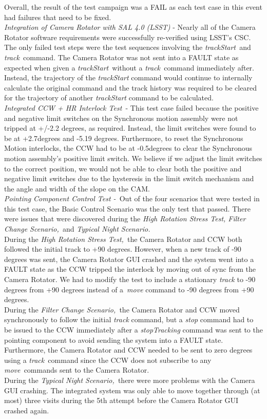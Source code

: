 \documentclass[SE,lsstdraft,STR,toc]{lsstdoc}
\begin{document}
 Overall, the result of the test campaign was a FAIL as each test case in
this event had failures that need to be
fixed.\\[2\baselineskip]\emph{Integration of Camera Rotator with SAL 4.0
(LSST)} - Nearly all of the Camera Rotator software requirements were
successfully re-verified using LSST's CSC. The only failed test steps
were the test sequences involving the \emph{trackStart~}and
\emph{track~}command. The Camera Rotator was not sent into a FAULT state
as expected when given a \emph{trackStart~}without a
\emph{track~}command immediately after. Instead, the trajectory of the
\emph{trackStart} command would continue to internally calculate the
original command and the track history was required to be cleared for
the trajectory of another \emph{trackStart} command to be
calculated.\\[2\baselineskip]\emph{Integrated CCW + HR Interlock Test~}-
This test case failed because the positive and negative limit switches
on the Synchronous motion assembly were not tripped at +/-2.2 degrees,
as required. Instead, the limit switches were found to be at +2.7degrees
and -5.19 degrees. Furthermore, to reset the Synchronous Motion
interlocks, the CCW had to be at -0.5degrees to clear the Synchronous
motion assembly's positive limit switch. We believe if we adjust the
limit switches to the correct position, we would not be able to clear
both the positive and negative limit switches due to the hysteresis in
the limit switch mechanism and the angle and width of the slope on the
CAM.\\[2\baselineskip]\emph{Pointing Component Control Test -~}Out of
the four scenarios that were tested in this test case, the Basic Control
Scenario was the only test that passed. There were issues that were
discovered during the \emph{High Rotation Stress Test, Filter Change
Scenario,~}and \emph{Typical Night Scenario.}\\
During the \emph{High Rotation Stress Test,~}the Camera Rotator and CCW
both followed the initial track to +90 degrees. However, when a new
track of -90 degrees was sent, the Camera Rotator GUI crashed and the
system went into a FAULT state as the CCW tripped the interlock by
moving out of sync from the Camera Rotator. We had to modify the test to
include a stationary \emph{track} to -90 degrees from +90 degrees
instead of a~\emph{move} command to -90 degrees from +90 degrees.\\
During the \emph{Filter Change Scenario,~}the Camera Rotator and CCW
moved synchronously to follow the initial \emph{track} command, but a
\emph{stop} command had to be issued to the CCW immediately after a
\emph{stopTracking} command was sent to the pointing component to avoid
sending the system into a FAULT state. Furthermore, the Camera Rotator
and CCW needed to be sent to zero degrees using a \emph{track~}command
since the CCW does not subscribe to any \emph{move~}commands sent to the
Camera Rotator.\\
During the \emph{Typical Night Scenario,~}there were more problems with
the Camera GUI crashing. The integrated system was only able to move
together through (at most) three visits during the 5th attempt before
the Camera Rotator GUI crashed again.~
\end{document}
